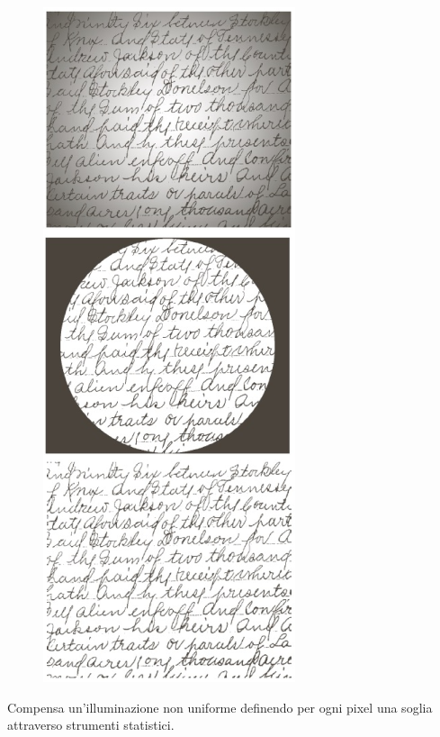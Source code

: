 \begin{figure}
	\includegraphics[width=.95\linewidth]{Picture/Moving_Average_Threshold}
\end{figure}
Compensa un'illuminazione non uniforme definendo per ogni pixel una soglia attraverso strumenti statistici.

